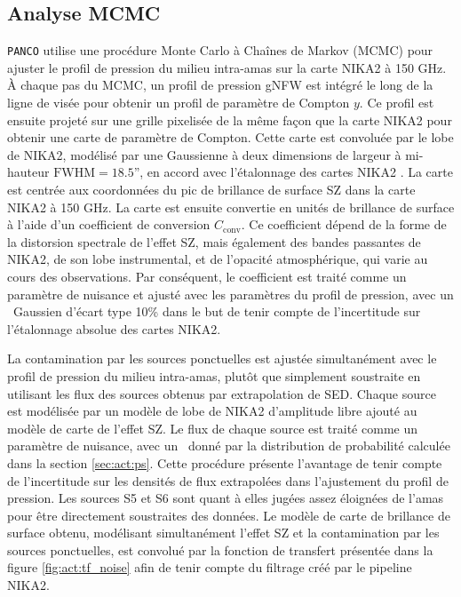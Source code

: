 \subsection{Analyse MCMC}

\texttt{PANCO} utilise une procédure Monte Carlo à Chaînes de Markov (MCMC) pour ajuster le profil de pression du milieu intra-amas sur la carte NIKA2 à 150 GHz.
À chaque pas du MCMC, un profil de pression gNFW est intégré le long de la ligne de visée pour obtenir un profil de paramètre de Compton $y$.
Ce profil est ensuite projeté sur une grille pixelisée de la même façon que la carte NIKA2 pour obtenir une carte de paramètre de Compton.
Cette carte est convoluée par le lobe de NIKA2, modélisé par une Gaussienne à deux dimensions de largeur à mi-hauteur $\mathrm{FWHM=18.5}$'', en accord avec l'étalonnage des cartes NIKA2 \cite{perotto_calibration_2020}.
La carte est centrée aux coordonnées du pic de brillance de surface SZ dans la carte NIKA2 à 150 GHz.
%
La carte est ensuite convertie en unités de brillance de surface à l'aide d'un coefficient de conversion $C_\mathrm{conv}$.
Ce coefficient dépend de la forme de la distorsion spectrale de l'effet SZ, mais également des bandes passantes de NIKA2, de son lobe instrumental, et de l'opacité atmosphérique, qui varie au cours des observations.
Par conséquent, le coefficient est traité comme un paramètre de nuisance et ajusté avec les paramètres du profil de pression, avec un \prior\ Gaussien d'écart type 10\% dans le but de tenir compte de l'incertitude sur l'étalonnage absolue des cartes NIKA2.

La contamination par les sources ponctuelles est ajustée simultanément avec le profil de pression du milieu intra-amas, plutôt que simplement soustraite en utilisant les flux des sources obtenus par extrapolation de SED.
Chaque source est modélisée par un modèle de lobe de NIKA2 d'amplitude libre ajouté au modèle de carte de l'effet SZ.
Le flux de chaque source est traité comme un paramètre de nuisance, avec un \prior\ donné par la distribution de probabilité calculée dans la section \ref{sec:act:ps}.
Cette procédure présente l'avantage de tenir compte de l'incertitude sur les densités de flux extrapolées dans l'ajustement du profil de pression.
Les sources S5 et S6 sont quant à elles jugées assez éloignées de l'amas pour être directement soustraites des données.
Le modèle de carte de brillance de surface obtenu, modélisant simultanément l'effet SZ et la contamination par les sources ponctuelles, est convolué par la fonction de transfert présentée dans la figure \ref{fig:act:tf_noise} afin de tenir compte du filtrage créé par le pipeline NIKA2.

